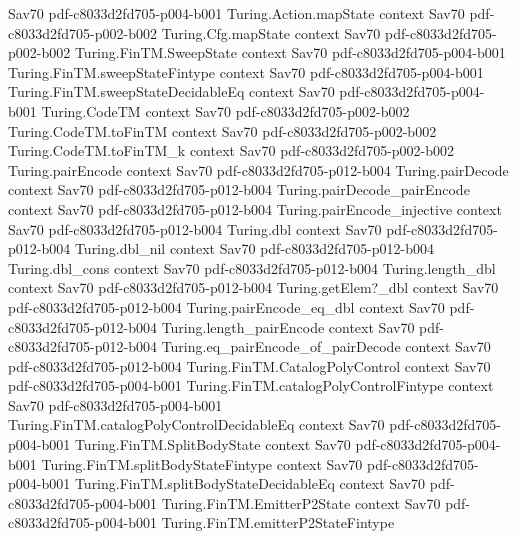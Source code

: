 \begin{theorem}
  {Sav70}
  {pdf-c8033d2fd705-p004-b001}
\proofstep
  {Turing.Action.mapState}
  {context}
  {Sav70}
  {pdf-c8033d2fd705-p002-b002}
\proofstep
  {Turing.Cfg.mapState}
  {context}
  {Sav70}
  {pdf-c8033d2fd705-p002-b002}
\proofstep
  {Turing.FinTM.SweepState}
  {context}
  {Sav70}
  {pdf-c8033d2fd705-p004-b001}
\proofstep
  {Turing.FinTM.sweepStateFintype}
  {context}
  {Sav70}
  {pdf-c8033d2fd705-p004-b001}
\proofstep
  {Turing.FinTM.sweepStateDecidableEq}
  {context}
  {Sav70}
  {pdf-c8033d2fd705-p004-b001}
\proofstep
  {Turing.CodeTM}
  {context}
  {Sav70}
  {pdf-c8033d2fd705-p002-b002}
\proofstep
  {Turing.CodeTM.toFinTM}
  {context}
  {Sav70}
  {pdf-c8033d2fd705-p002-b002}
\proofstep
  {Turing.CodeTM.toFinTM_k}
  {context}
  {Sav70}
  {pdf-c8033d2fd705-p002-b002}
\proofstep
  {Turing.pairEncode}
  {context}
  {Sav70}
  {pdf-c8033d2fd705-p012-b004}
\proofstep
  {Turing.pairDecode}
  {context}
  {Sav70}
  {pdf-c8033d2fd705-p012-b004}
\proofstep
  {Turing.pairDecode_pairEncode}
  {context}
  {Sav70}
  {pdf-c8033d2fd705-p012-b004}
\proofstep
  {Turing.pairEncode_injective}
  {context}
  {Sav70}
  {pdf-c8033d2fd705-p012-b004}
\proofstep
  {Turing.dbl}
  {context}
  {Sav70}
  {pdf-c8033d2fd705-p012-b004}
\proofstep
  {Turing.dbl_nil}
  {context}
  {Sav70}
  {pdf-c8033d2fd705-p012-b004}
\proofstep
  {Turing.dbl_cons}
  {context}
  {Sav70}
  {pdf-c8033d2fd705-p012-b004}
\proofstep
  {Turing.length_dbl}
  {context}
  {Sav70}
  {pdf-c8033d2fd705-p012-b004}
\proofstep
  {Turing.getElem?_dbl}
  {context}
  {Sav70}
  {pdf-c8033d2fd705-p012-b004}
\proofstep
  {Turing.pairEncode_eq_dbl}
  {context}
  {Sav70}
  {pdf-c8033d2fd705-p012-b004}
\proofstep
  {Turing.length_pairEncode}
  {context}
  {Sav70}
  {pdf-c8033d2fd705-p012-b004}
\proofstep
  {Turing.eq_pairEncode_of_pairDecode}
  {context}
  {Sav70}
  {pdf-c8033d2fd705-p012-b004}
\proofstep
  {Turing.FinTM.CatalogPolyControl}
  {context}
  {Sav70}
  {pdf-c8033d2fd705-p004-b001}
\proofstep
  {Turing.FinTM.catalogPolyControlFintype}
  {context}
  {Sav70}
  {pdf-c8033d2fd705-p004-b001}
\proofstep
  {Turing.FinTM.catalogPolyControlDecidableEq}
  {context}
  {Sav70}
  {pdf-c8033d2fd705-p004-b001}
\proofstep
  {Turing.FinTM.SplitBodyState}
  {context}
  {Sav70}
  {pdf-c8033d2fd705-p004-b001}
\proofstep
  {Turing.FinTM.splitBodyStateFintype}
  {context}
  {Sav70}
  {pdf-c8033d2fd705-p004-b001}
\proofstep
  {Turing.FinTM.splitBodyStateDecidableEq}
  {context}
  {Sav70}
  {pdf-c8033d2fd705-p004-b001}
\proofstep
  {Turing.FinTM.EmitterP2State}
  {context}
  {Sav70}
  {pdf-c8033d2fd705-p004-b001}
\proofstep
  {Turing.FinTM.emitterP2StateFintype}

\end{theorem}
